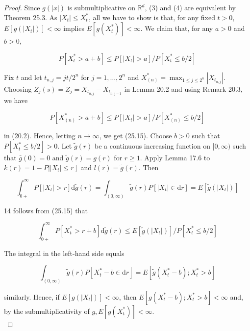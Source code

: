 \documentclass[a4paper,11pt]{article}
\begin{document}
\begin{proof}
    Since $g(|x|)$ is submultiplicative on $\mathbb{R}^{d}$, (3) and (4) are equivalent by
    Theorem 25.3. As $\left|X_{t}\right| \leq X_{t}^{*}$, all we have to show is that, for
    any fixed $t>0$, $E\left[g\left(\left|X_{t}\right|\right)\right]<\infty$ implies
    $E\left[g\left(X_{t}^{*}\right)\right]<\infty$. We claim that, for any $a>0$ and $b>0$,

    \begin{equation*}
        P\left[X_{t}^{*}>a+b\right] \leq P\left[\left|X_{t}\right|>a\right] / P\left[X_{t}^{*} \leq b / 2\right] \tag{25.15}
    \end{equation*}

    Fix $t$ and let $t_{n, j}=j t / 2^{n}$ for $j=1, \ldots, 2^{n}$ and $X_{(n)}^{*}=\max _{1 \leq j \leq 2^{n}}\left|X_{t_{n, j}}\right|$. Choosing $Z_{j}(s)=Z_{j}=X_{t_{n, j}}-X_{t_{n, j-1}}$ in Lemma 20.2 and using Remark 20.3, we have

    $$
        P\left[X_{(n)}^{*}>a+b\right] \leq P\left[\left|X_{t}\right|>a\right] / P\left[X_{(n)}^{*} \leq b / 2\right]
    $$

    in (20.2). Hence, letting $n \rightarrow \infty$, we get (25.15).
    Choose $b>0$ such that $P\left[X_{t}^{*} \leq b / 2\right]>0$.
    Let $\tilde{g}(r)$ be a continuous increasing function on $[0, \infty)$
                    such that $\bar{g}(0)=0$ and $\tilde{g}(r)=g(r)$ for $r \geq 1$.
                    Apply Lemma 17.6 to $\left.k(r)=1-P|| X_{t} \mid \leq r\right]$ and $l(r)=\tilde{g}(r)$. Then

    $$
        \int_{0+}^{\infty} P\left[\left|X_{t}\right|>r\right] \mathrm{d} \tilde{g}(r)=\int_{(0, \infty)} \tilde{g}(r) P\left[\left|X_{t}\right| \in \mathrm{d} r\right]=E\left[\widetilde{g}\left(\left|X_{t}\right|\right)\right]
    $$

    14 follows from (25.15) that

    $$
        \int_{0+}^{\infty} P\left[X_{t}^{*}>r+b\right] \mathrm{d} \widetilde{g}(r) \leq E\left[\widetilde{g}\left(\left|X_{t}\right|\right)\right] / P\left[X_{t}^{*} \leq b / 2\right]
    $$

    The integral in the left-hand side equals

    $$
        \int_{(0, \infty)} \tilde{g}(r) P\left[X_{t}^{*}-b \in \mathrm{d} r\right]=E\left[\tilde{g}\left(X_{t}^{*}-b\right) ; X_{t}^{*}>b\right]
    $$

    similarly. Hence, if $E\left[g\left(\left|X_{t}\right|\right)\right]<\infty$,
    then $E\left[g\left(X_{t}^{*}-b\right) ; X_{t}^{*}>b\right]<\infty$ and,
    by the submultiplicativity of $g, E\left[g\left(X_{t}^{*}\right)\right]<\infty$. \\

\end{proof}
\end{document}
